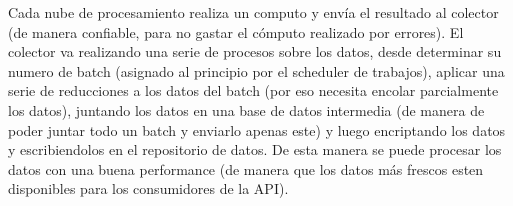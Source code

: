 Cada nube de procesamiento realiza un computo y envía el resultado al
colector (de manera confiable, para no gastar el cómputo realizado por
errores). El colector va realizando una serie de procesos sobre los datos,
desde determinar su numero de batch (asignado al principio por el 
scheduler de trabajos), aplicar una serie de reducciones a los datos del
batch (por eso necesita encolar parcialmente los datos), juntando los datos
en una base de datos intermedia (de manera de poder juntar todo un batch
y enviarlo apenas este) y luego encriptando los datos y escribiendolos en el
repositorio de datos. De esta manera se puede procesar los datos con una 
buena performance (de manera que los datos más frescos esten disponibles 
para los consumidores de la API).
